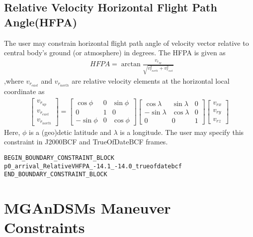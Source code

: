 \documentclass[11pt]{article}
\begin{document}
\subsection{Relative Velocity Horizontal Flight Path Angle(HFPA)}
\label{subsec:relativevelocity_hfpa}
The user may constrain horizontal flight path angle of velocity vector relative to central body's ground (or atmosphere) in degrees. The HFPA is given as
\begin{equation}
	\label{eq:rel_velocity_HFPA}
	\begin{aligned}
		&HFPA = \arctan{\frac{v_{r_{up}}}{\sqrt{v_{r_{north}}^2 + v_{r_{east}}^2}}}
	\end{aligned}
\end{equation}
,where $v_{r_{east}}$ and $v_{r_{north}}$ are relative velocity elements at the horizontal local coordinate as
\begin{equation}
	\label{eq:rel_velocity_local}
	\begin{aligned}
		\begin{bmatrix}
		v_{r_{up}}\\
		v_{r_{east}}\\
		v_{r_{north}}
		\end{bmatrix} =
		\begin{bmatrix}
		\cos{\phi} & 0 & \sin{\phi}\\
		0 & 1 & 0\\
		-\sin{\phi} & 0 & \cos{\phi}
		\end{bmatrix}
		\begin{bmatrix}
		\cos{\lambda} & \sin{\lambda} & 0\\
		-\sin{\lambda}& \cos{\lambda} & 0\\
		0 & 0 & 1
		\end{bmatrix}
		\begin{bmatrix}
		v_{rx}\\
		v_{ry}\\
		v_{rz}
		\end{bmatrix}
	\end{aligned}
\end{equation}
Here, $\phi$ is a (geo)detic latitude and $\lambda$ is a longitude. The user may specify this constraint in J2000BCF and TrueOfDateBCF frames.

\begin{verbatim}
BEGIN_BOUNDARY_CONSTRAINT_BLOCK
p0_arrival_RelativeVHFPA_-14.1_-14.0_trueofdatebcf
END_BOUNDARY_CONSTRAINT_BLOCK
\end{verbatim}


\section{MGAnDSMs Maneuver Constraints}
\label{sec:MGAnDSMs_Maneuver_Constraints}
\end{document}
